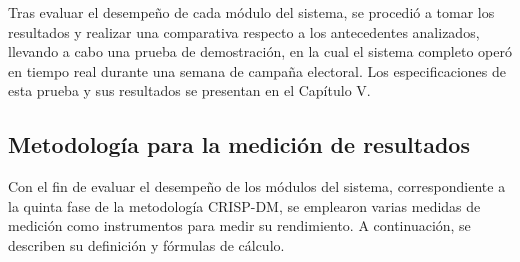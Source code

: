 Tras evaluar el desempeño de cada módulo del sistema, se procedió a tomar los resultados y realizar una comparativa respecto a los antecedentes analizados, llevando a cabo una prueba de demostración, en la cual el sistema completo operó en tiempo real durante una semana de campaña electoral. Los especificaciones de esta prueba y sus resultados se presentan en el Capítulo V.
 
\subsection{Metodología para la medición de resultados}
 
Con el fin de evaluar el desempeño de los módulos del sistema, correspondiente a la quinta fase de la metodología CRISP-DM, se emplearon varias medidas de medición como instrumentos para medir su rendimiento. A continuación, se describen su definición y fórmulas de cálculo.
 
